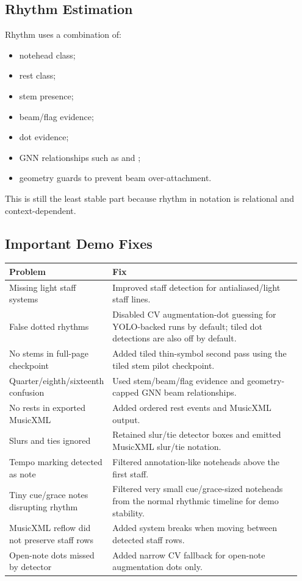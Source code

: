 \documentclass[11pt]{article}
\newcommand{\code}[1]{\texttt{\detokenize{#1}}}
\begin{document}
\subsection{Rhythm Estimation}

Rhythm uses a combination of:

\begin{itemize}
  \item notehead class;
  \item rest class;
  \item stem presence;
  \item beam/flag evidence;
  \item dot evidence;
  \item GNN relationships such as \code{stem_notehead} and \code{beam_notegroup};
  \item geometry guards to prevent beam over-attachment.
\end{itemize}

This is still the least stable part because rhythm in notation is relational and context-dependent.

\subsection{Important Demo Fixes}

\begin{longtable}{p{0.25\linewidth}p{0.70\linewidth}}
\toprule
\textbf{Problem} & \textbf{Fix}\\
\midrule
\endhead
Missing light staff systems & Improved staff detection for antialiased/light staff lines.\\
False dotted rhythms & Disabled CV augmentation-dot guessing for YOLO-backed runs by default; tiled dot detections are also off by default.\\
No stems in full-page checkpoint & Added tiled thin-symbol second pass using the tiled stem pilot checkpoint.\\
Quarter/eighth/sixteenth confusion & Used stem/beam/flag evidence and geometry-capped GNN beam relationships.\\
No rests in exported MusicXML & Added ordered rest events and MusicXML \code{<rest/>} output.\\
Slurs and ties ignored & Retained slur/tie detector boxes and emitted MusicXML slur/tie notation.\\
Tempo marking detected as note & Filtered annotation-like noteheads above the first staff.\\
Tiny cue/grace notes disrupting rhythm & Filtered very small cue/grace-sized noteheads from the normal rhythmic timeline for demo stability.\\
MusicXML reflow did not preserve staff rows & Added system breaks when moving between detected staff rows.\\
Open-note dots missed by detector & Added narrow CV fallback for open-note augmentation dots only.\\
\bottomrule
\end{longtable}
\end{document}
